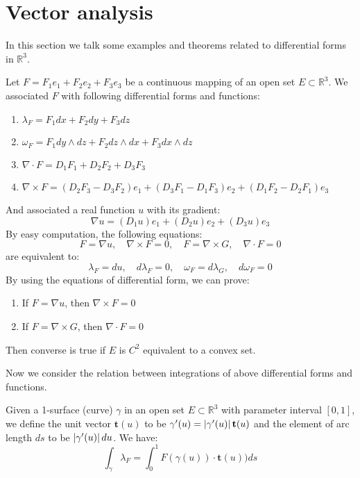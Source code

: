 \section{Vector analysis}
In this section we talk some examples and theorems related to differential forms in $\mathbb{R}^3$.\par
Let $F=F_1e_1+F_2e_2+F_3e_3$ be a continuous mapping of an open set $E\subset \mathbb{R}^3$. We associated $F$ with following differential forms and functions:
\begin{enumerate}
    \item $\lambda_F=F_1dx+F_2dy+F_3dz$
    \item $\omega_F=F_1dy\wedge dz+F_2dz\wedge dx+F_3dx\wedge dz$
    \item $\nabla\cdot F=D_1F_1+D_2F_2+D_3F_3$
    \item $\nabla\times F=(D_2F_3-D_3F_2)e_1+(D_3F_1-D_1F_3)e_2+(D_1F_2-D_2F_1)e_3$
\end{enumerate}
And associated a real function $u$ with its gradient:
\begin{equation*}
    \nabla u=(D_1u)e_1+(D_2u)e_2+(D_3u)e_3
\end{equation*}
By easy computation, the following equations:
\begin{equation*}
    F=\nabla u,\quad \nabla\times F=0,\quad F=\nabla\times G,\quad \nabla\cdot F=0
\end{equation*}
are equivalent to:
\begin{equation*}
    \lambda_F=du,\quad d\lambda_F=0,\quad \omega_F=d\lambda_G,\quad d\omega_F=0
\end{equation*}
By using the equations of differential form, we can prove:
\begin{enumerate}
    \item If $F=\nabla u$, then $\nabla\times F=0$
    \item If $F=\nabla\times G$, then $\nabla\cdot F=0$
\end{enumerate}
Then converse is true if $E$ is $C^2$ equivalent to a convex set.\par
Now we consider the relation between integrations of above differential forms and functions.\par
Given a 1-surface (curve) $\gamma$ in an open set $E\subset \mathbb{R}^3$ with parameter interval $[0,1]$, we define the unit vector $\mathbf{t}(u)$ to be $\gamma'(u)=\left\lvert\gamma'(u)\right\rvert\mathbf{t}(u)$ and the element of arc length $ds$ to be $\left\lvert\gamma'(u)\right\rvert du$. We have:
\begin{equation*}
    \int_{\gamma}{\lambda_F}=\int_{0}^1{F(\gamma(u))\cdot \mathbf{t}(u))ds}
\end{equation*}
